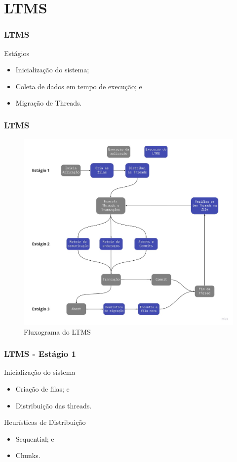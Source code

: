 \documentclass[10pt, pdf,xcolor=pdftex,dvipsnames,table]{beamer}
\begin{document}
\section{LTMS}
\begin{frame} \frametitle{LTMS}
    \begin{block}{Estágios}
        \begin{itemize}
        	\item Inicialização do sistema;
        	\item Coleta de dados em tempo de execução; e
        	\item Migração de Threads.
        \end{itemize}
    \end{block}
\end{frame}

\begin{frame} \frametitle{LTMS}
    \begin{figure}[!h]
        \centering
        \includegraphics[scale=0.2]{images/LTMS1}
        \caption{Fluxograma do LTMS}
        \label{fig:abusy}
    \end{figure}
\end{frame}

\begin{frame} \frametitle{LTMS - Estágio 1}
    \begin{block}{Inicialização do sistema}
        \begin{itemize}
        	\item Criação de filas; e
        	\item Distribuição das threads.
        \end{itemize}
    \end{block}

    \begin{block}{Heurísticas de Distribuição}
        \begin{itemize}
        	\item Sequential; e
        	\item Chunks.
        \end{itemize}
    \end{block}
\end{frame}
\end{document}
